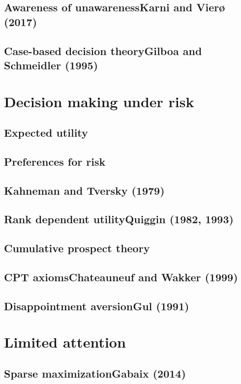 \documentclass[letterpaper, 12pt, titlepage]{article}
\begin{document}
\subsection{Awareness of unawareness\textemdash Karni and Vier\o \,(2017)}
\label{subsec:kv-awareness}

\subsection{Case-based decision theory\textemdash Gilboa and Schmeidler (1995)}
\label{subsec:gs-cbdt}

\section{Decision making under risk}
\label{sec:risk}

\subsection{Expected utility}
\label{subsec:expected-utility}

\subsection{Preferences for risk}
\label{subsec:risk-pref}

\subsection{Kahneman and Tversky (1979)}
\label{subsec:kt}

\subsection{Rank dependent utility\textemdash Quiggin (1982, 1993)}
\label{subsec:quiggin-rdu}

\subsection{Cumulative prospect theory}
\label{subsec:cpt}

\subsection{CPT axioms\textemdash Chateauneuf and Wakker (1999)}
\label{subsec:cpt-axioms}

\subsection{Disappointment aversion\textemdash Gul (1991)}
\label{subsec:gul-dis-aversion}

\section{Limited attention}
\label{sec:limited-attention}

\subsection{Sparse maximization\textemdash Gabaix (2014)}
\label{subsec:label}
\end{document}
